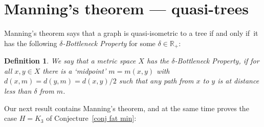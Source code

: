 \documentclass[a4paper]{article}
\newcommand{\comment}[1]{}
\newcommand{\defi}[1]{{\color{darkgray}\emph{#1}}}
\newtheorem{lemma}[proposition]{Lemma}
\newcommand{\R}{\ensuremath{\mathbb R}}
\newcommand{\Cnr}[1]{Con\-jecture~\ref{#1}}
\renewcommand{\iff}{if and only if}
\newcommand{\fe}{for every}
\newcommand{\st}{such that}
\newtheorem{remark}{Remark}
\newtheorem{Def}{Definition}
\begin{document}
\comment{
\section{A Coarse Ramsey Theorem}

\begin{lemma} \label{ramsey}
(Coarse Ramsey Theorem)  Let $(X,d)$ be a metric space, and $U\subset X$ infinite. Then \fe\ $R\in \R_+$, there is either\\
A) an infinite $U'\subset U$ \st\ $d(u,v)>R$ \fe\ $u,v\in U'$, or \\
B) a ball of radius $R$ in $X$ containing all but finitely many elements of $U$.
\end{lemma}
\begin{proof}\textcolor{red}{TOPROVE 4}\end{proof}
 
\begin{remark}

\end{remark}
}


\section{Manning's theorem --- quasi-trees} \label{quasitree}

Manning's theorem  \cite{Manning} says that a graph is quasi-isometric to a tree \iff\ it has the following \defi{$\delta$-\defi{Bottleneck Property}} for some $\delta\in \R_+$:

\begin{Def}
We say that a metric space $X$ has the $\delta$-\defi{Bottleneck Property},  if for all $x, y \in X$  there is a `midpoint' $m = m(x,y)$ with $d(x,m) = d(y,m) = d(x,y)/2$ such that any path from $x$ to $y$ is at distance less than $\delta$ from $m$.
\end{Def}

Our next result contains Manning's theorem, and at the same time proves the case $H=K_3$ of \Cnr{conj fat min}:
\end{document}
